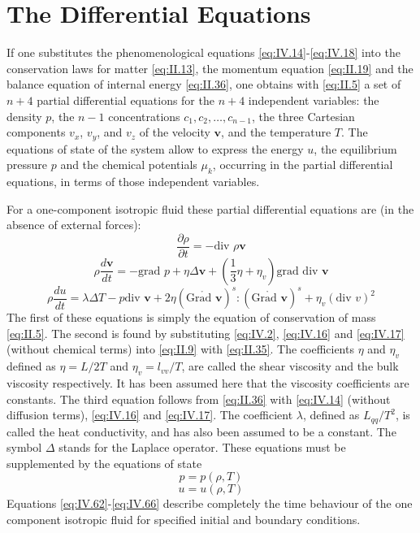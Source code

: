 \section{The Differential Equations}

If one substitutes the phenomenological equations \eqref{eq:IV.14}-\eqref{eq:IV.18} into the conservation laws for matter \eqref{eq:II.13}, the momentum equation \eqref{eq:II.19} and the balance equation of internal energy \eqref{eq:II.36}, one obtains with \eqref{eq:II.5} a set of $n + 4$ partial differential equations for the $n + 4$ independent
variables: the density $p$, the $n - 1$ concentrations $c_1,
c_2 , \ldots , c_{n-1}$, the three Cartesian components $v_x$, $v_y$, and $v_z$ of the
velocity $\bm{v}$, and the temperature $T$. The equations of state of the system allow to express the energy $u$, the equilibrium pressure $p$ and the chemical potentials $\mu_k$, occurring in the partial differential equations, in terms of those independent variables.

For a one-component isotropic fluid these partial differential equations are (in the absence of external forces):
\begin{equation}
\frac{\partial \rho}{\partial t} = - \textrm{div } \rho \bm{v}
    \label{eq:IV.62}
\end{equation}
\begin{equation}
\rho \frac{d \bm{v}}{d t} = - \textrm{grad } p + \eta \Delta \bm{v} + \left(\frac{1}{3} \eta + \eta_v \right) \textrm{grad div } \bm{v}
    \label{eq:IV.63}
\end{equation}
\begin{equation}
\rho \frac{d u}{d t} = \lambda \Delta T - p \textrm{div } \bm{v} + 2 \eta (\mathring{\textrm{Grad } \bm{v}})^s : (\mathring{\textrm{Grad } \bm{v}})^s 
+ \eta_v (\textrm{div } v)^2
    \label{eq:IV.64}
\end{equation}
The first of these equations is simply the equation of conservation of mass \eqref{eq:II.5}. The second is found by substituting \eqref{eq:IV.2}, \eqref{eq:IV.16} and \eqref{eq:IV.17} (without chemical terms) into \eqref{eq:II.9} with \eqref{eq:II.35}. The coefficients $\eta$ and $\eta_v$ defined as $\eta = L/2T$ and $\eta_v = l_{vv}/T$, are called the shear viscosity and the bulk viscosity respectively. It has been assumed here that the viscosity coefficients are constants. The third equation follows from \eqref{eq:II.36} with \eqref{eq:IV.14} (without diffusion terms), \eqref{eq:IV.16} and \eqref{eq:IV.17}. The coefficient $\lambda$, defined as $L_{qq}/T^2$, is called the heat conductivity, and has also been assumed to be a constant. The symbol $\Delta$ stands for the Laplace operator. These equations must be supplemented by the equations of state
\begin{equation}
p = p(\rho, T)
    \label{eq:IV.65}
\end{equation}
\begin{equation}
u = u(\rho, T)
    \label{eq:IV.66}
\end{equation}
Equations \eqref{eq:IV.62}-\eqref{eq:IV.66} describe completely the time behaviour of the one component isotropic fluid for specified initial and boundary conditions. 

